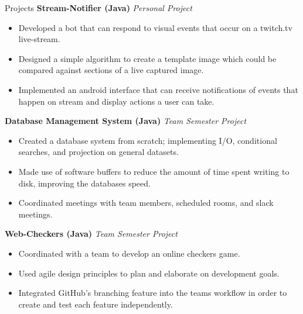 \documentclass{resume} %
\begin{document}
\begin{rSection}{Projects}
{\bf Stream-Notifier (Java)} \hfill {\em Personal Project}
\begin{itemize}[noitemsep]
    \item Developed a bot that can respond to visual events that occur on a twitch.tv live-stream. 
    \item Designed a simple algorithm to create a template image which could be compared against sections of a live captured image.
    \item Implemented an android interface that can receive notifications of events that happen on stream and display actions a user can take.
\end{itemize}

{\bf Database Management System (Java)} \hfill {\em Team Semester Project}
\begin{itemize}[noitemsep]
    \item Created a database system from scratch; implementing I/O, conditional searches, and projection on general datasets.
    \item Made use of software buffers to reduce the amount of time spent writing to disk, improving the databases speed. 
    \item Coordinated meetings with team members, scheduled rooms, and slack meetings.
\end{itemize}

{\bf Web-Checkers (Java)} \hfill {\em Team Semester Project}
\begin{itemize}[noitemsep]
    \item Coordinated with a team to develop an online checkers game.
    \item Used agile design principles to plan and elaborate on development goals.
    \item Integrated GitHub's branching feature into the teams workflow in order to create and test each feature independently.
\end{itemize}

\end{rSection}
\end{document}
